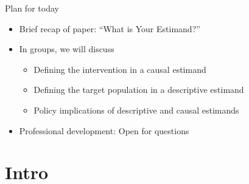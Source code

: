 \documentclass{beamer}
\begin{document}
\begin{frame}{Plan for today}
\begin{itemize}
\item Brief recap of paper: ``What is Your Estimand?''
\item In groups, we will discuss
\begin{itemize}
\item Defining the intervention in a causal estimand
\item Defining the target population in a descriptive estimand
\item Policy implications of descriptive and causal estimands
\end{itemize}
\item Professional development: Open for questions
\end{itemize}
\end{frame}

\section{Intro}
\end{document}
